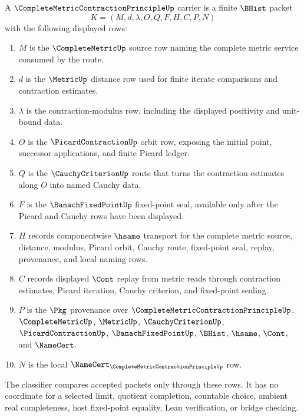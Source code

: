 \begin{definition}
\label{def:complete-metric-contraction-principle-carrier}
A $\CompleteMetricContractionPrincipleUp$ carrier is a finite $\BHist$ packet
$$
K=(M,d,\lambda,O,Q,F,H,C,P,N)
$$
with the following displayed rows:
\begin{enumerate}
\item $M$ is the $\CompleteMetricUp$ source row naming the complete metric service consumed by the route.
\item $d$ is the $\MetricUp$ distance row used for finite iterate comparisons and contraction estimates.
\item $\lambda$ is the contraction-modulus row, including the displayed positivity and unit-bound data.
\item $O$ is the $\PicardContractionUp$ orbit row, exposing the initial point, successor applications, and finite Picard ledger.
\item $Q$ is the $\CauchyCriterionUp$ route that turns the contraction estimates along $O$ into named Cauchy data.
\item $F$ is the $\BanachFixedPointUp$ fixed-point seal, available only after the Picard and Cauchy rows have been displayed.
\item $H$ records componentwise $\hsame$ transport for the complete metric source, distance, modulus, Picard orbit, Cauchy route, fixed-point seal, replay, provenance, and local naming rows.
\item $C$ records displayed $\Cont$ replay from metric reads through contraction estimates, Picard iteration, Cauchy criterion, and fixed-point sealing.
\item $P$ is the $\Pkg$ provenance over $\CompleteMetricContractionPrincipleUp$, $\CompleteMetricUp$, $\MetricUp$, $\CauchyCriterionUp$, $\PicardContractionUp$, $\BanachFixedPointUp$, $\BHist$, $\hsame$, $\Cont$, and $\NameCert$.
\item $N$ is the local $\NameCert_{\CompleteMetricContractionPrincipleUp}$ row.
\end{enumerate}
The classifier compares accepted packets only through these rows. It has no coordinate for a selected limit, quotient completion, countable choice, ambient real completeness, host fixed-point equality, Lean verification, or bridge checking.
\end{definition}

